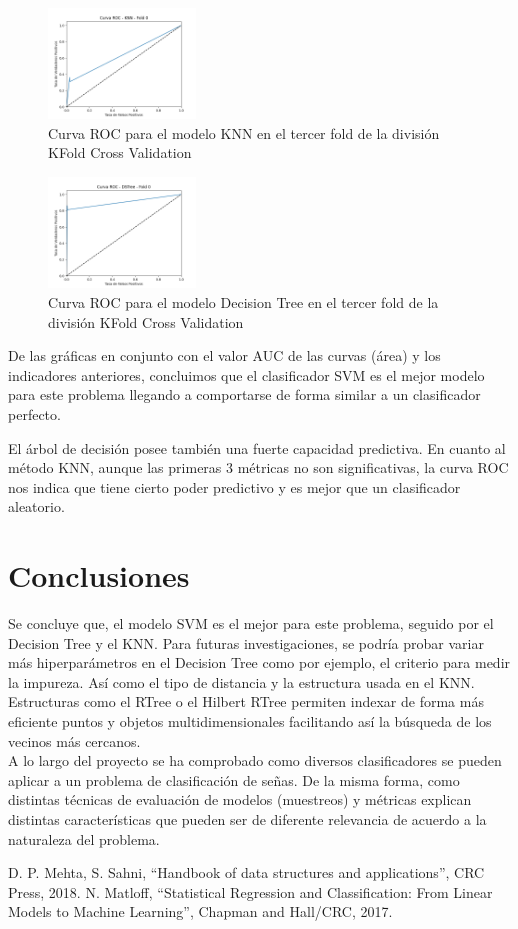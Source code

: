 \documentclass[conference]{IEEEtran}
\begin{document}
\begin{figure}[ht]
    \centering
    \includegraphics[width=0.35\textwidth]{images/plots/kfold_roc_kdtree_fold0.png}
    \caption{Curva ROC para el modelo KNN en el tercer fold de la división KFold Cross Validation}
    \label{fig:kfold_roc_knn_fold_2}
\end{figure}

\begin{figure}[ht]
    \centering
    \includegraphics[width=0.35\textwidth]{images/plots/kfold_roc_dstree_fold0.png}
    \caption{Curva ROC para el modelo Decision Tree en el tercer fold de la división KFold Cross Validation}
    \label{fig:kfold_roc_dt_fold_2}
\end{figure}
De las gráficas en conjunto con el valor AUC de las curvas (área) y los indicadores anteriores, concluimos que el clasificador
SVM es el mejor modelo para este problema llegando a comportarse de forma similar a un clasificador perfecto.

El árbol de decisión posee también una fuerte capacidad predictiva. En cuanto al método KNN,
aunque las primeras 3 métricas no son significativas, la curva ROC nos indica que 
tiene cierto poder predictivo y es mejor que un clasificador aleatorio.

\section{Conclusiones}
Se concluye que, el modelo SVM es el mejor para este problema, seguido por el Decision Tree y el KNN.
Para futuras investigaciones, se podría probar variar más hiperparámetros en el Decision Tree como por ejemplo,
el criterio para medir la impureza. Así como el tipo de distancia y la estructura usada en el KNN.
Estructuras como el RTree o el Hilbert RTree permiten indexar de forma más eficiente puntos y objetos multidimensionales facilitando
así la búsqueda de los vecinos más cercanos.
\\
A lo largo del proyecto se ha comprobado como diversos clasificadores se pueden
aplicar a un problema de clasificación de señas. De la misma forma, como distintas
técnicas de evaluación de modelos (muestreos) y métricas explican distintas características
que pueden ser de diferente relevancia de acuerdo a la naturaleza del problema.

\begin{thebibliography}{00}
 D. P. Mehta, S. Sahni, ``Handbook of data structures and applications'', CRC Press, 2018.
 N. Matloff, ``Statistical Regression and Classification: From Linear Models to Machine Learning'', Chapman and Hall/CRC, 2017.
\end{thebibliography}
\end{document}
